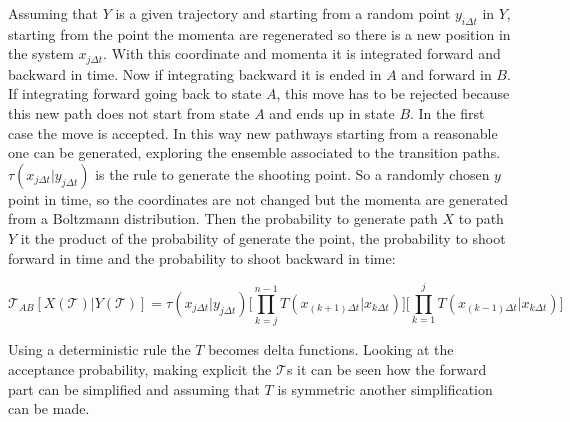 	Assuming that $Y$ is a given trajectory and starting from a random point $y_{i\Delta t}$ in $Y$, starting from the point the momenta are regenerated so there is a new position in the system $x_{j\Delta t}$.
	With this coordinate and momenta it is integrated forward and backward in time.
	Now if integrating backward it is ended in $A$ and forward in $B$.
	If integrating forward going back to state $A$, this move has to be rejected because this new path does not start from state $A$ and ends up in state $B$.
	In the first case the move is accepted.
	In this way new pathways starting from a reasonable one can be generated, exploring the ensemble associated to the transition paths.
	$\tau(x_{j\Delta t}|y_{j\Delta t})$ is the rule to generate the shooting point.
	So a randomly chosen $y$ point in time, so the coordinates are not changed but the momenta are generated from a Boltzmann distribution.
	Then the probability to generate path $X$ to path $Y$ it the product of the probability of generate the point, the probability to shoot forward in time and the probability to shoot backward in time:

	$$\mathcal{T}_{AB}[X(\mathcal{T})|Y(\mathcal{T})] = \tau(x_{j\Delta t}|y_{j\Delta t})\biggl[\prod\limits_{k=j}^{n-1}T(x_{(k+1)\Delta t}|x_{k\Delta t})\biggr]\biggl[\prod\limits_{k=1}^jT(x_{(k-1)\Delta t}|x_{k\Delta t})\biggr]$$

	Using a deterministic rule the $T$ becomes delta functions.
	Looking at the acceptance probability, making explicit the $\mathcal{T}$s it can be seen how the forward part can be simplified and assuming that $T$ is symmetric another simplification can be made.

